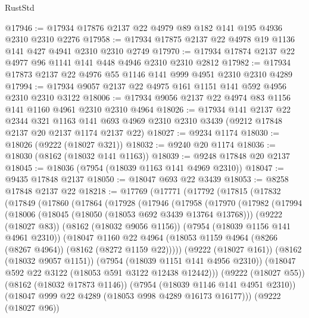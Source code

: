 \begin{lexlean}{RustStd}
\begin{coremodule}
@17946 := @17934 @17876 @2137 @22 @4979 @89 @182 @141 @195 @4936 @2310 @2310 @2276
@17958 := @17934 @17875 @2137 @22 @4978 @19 @1136 @141 @427 @4941 @2310 @2310 @2749
@17970 := @17934 @17874 @2137 @22 @4977 @96 @1141 @141 @448 @4946 @2310 @2310 @2812
@17982 := @17934 @17873 @2137 @22 @4976 @55 @1146 @141 @999 @4951 @2310 @2310 @4289
@17994 := @17934 @9057 @2137 @22 @4975 @161 @1151 @141 @592 @4956 @2310 @2310 @3122
@18006 := @17934 @9056 @2137 @22 @4974 @83 @1156 @141 @1160 @4961 @2310 @2310 @4964
@18026 := @17934
    @141
    @2137
    @22
    @2344
    @321
    @1163
    @141
    @693
    @4969
    @2310
    @2310
    @3439
    (@9212 @17848 @2137 @20 @2137 @1174 @2137 @22)
@18027 := @9234 @1174
@18030 := @18026 (@9222 (@18027 @321))
@18032 := @9240 @20 @1174
@18036 := @18030 (@8162 (@18032 @141 @1163))
@18039 := @9248 @17848 @20 @2137
@18045 := @18036 (@7954 (@18039 @1163 @141 @4969 @2310))
@18047 := @9435 @17848 @2137
@18050 := @18047 @693 @22 @3439
@18053 := @8258 @17848 @2137 @22
@18218 := @17769
    (@17771
      (@17792
        (@17815
          (@17832
            (@17849
              (@17860
                (@17864
                  (@17928
                    (@17946
                      (@17958
                        (@17970
                          (@17982
                            (@17994
                              (@18006
                                (@18045 (@18050 (@18053 @692 @3439 @13764 @13768)))
                                (@9222 (@18027 @83))
                                (@8162 (@18032 @9056 @1156))
                                (@7954 (@18039 @1156 @141 @4961 @2310))
                                (@18047
                                  @1160
                                  @22
                                  @4964
                                  (@18053
                                    @1159
                                    @4964
                                    (@8266 (@8267 @4964))
                                    (@8162 (@8272 @1159 @22)))))
                              (@9222 (@18027 @161))
                              (@8162 (@18032 @9057 @1151))
                              (@7954 (@18039 @1151 @141 @4956 @2310))
                              (@18047 @592 @22 @3122 (@18053 @591 @3122 @12438 @12442)))
                            (@9222 (@18027 @55))
                            (@8162 (@18032 @17873 @1146))
                            (@7954 (@18039 @1146 @141 @4951 @2310))
                            (@18047 @999 @22 @4289 (@18053 @998 @4289 @16173 @16177)))
                          (@9222 (@18027 @96))

\end{coremodule}
\end{lexlean}
